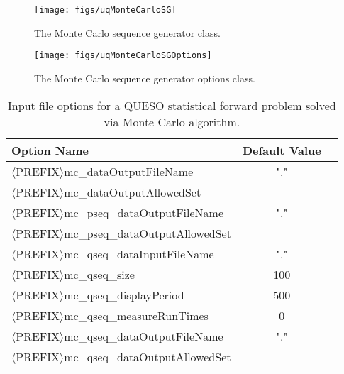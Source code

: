 \begin{figure}[htpb]
\centering
\texttt{[image: figs/uqMonteCarloSG]}
\vspace*{-8pt}
\caption{The Monte Carlo sequence generator class.}
\label{fig-monte-carlo-solver-class}
\end{figure}

\begin{figure}[htpb]
\centering
\texttt{[image: figs/uqMonteCarloSGOptions]}
\vspace*{-8pt}
\caption{The Monte Carlo sequence generator options class.}
\label{fig-monte-carlo-options-class}
\end{figure}


\begin{table}[htpb]
\begin{center}
\caption{Input file options for a QUESO statistical forward problem solved via Monte Carlo algorithm.}
\label{tab-monte-carlo-options}
\ttfamily
\begin{tabular}{l c  m{6cm}}
\toprule
\rmfamily Option Name     & \rmfamily Default Value \\
\midrule\midrule
$\langle$PREFIX$\rangle$mc\_dataOutputFileName           &  "."  \\
$\langle$PREFIX$\rangle$mc\_dataOutputAllowedSet         &       \\
$\langle$PREFIX$\rangle$mc\_pseq\_dataOutputFileName     &  "."  \\
$\langle$PREFIX$\rangle$mc\_pseq\_dataOutputAllowedSet   &       \\
$\langle$PREFIX$\rangle$mc\_qseq\_dataInputFileName      &  "."  \\
$\langle$PREFIX$\rangle$mc\_qseq\_size                   &  100  \\
$\langle$PREFIX$\rangle$mc\_qseq\_displayPeriod          &  500  \\  
$\langle$PREFIX$\rangle$mc\_qseq\_measureRunTimes        &    0  \\  
$\langle$PREFIX$\rangle$mc\_qseq\_dataOutputFileName     &  "."  \\ 
$\langle$PREFIX$\rangle$mc\_qseq\_dataOutputAllowedSet   &       \\  
\bottomrule
\end{tabular}
\end{center}
\end{table}


